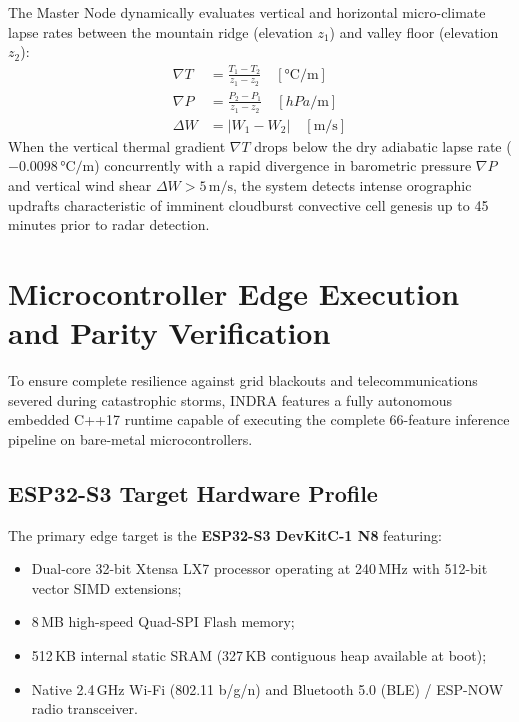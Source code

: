 \documentclass[journal,a4paper]{IEEEtran}
\begin{document}
The Master Node dynamically evaluates vertical and horizontal micro-climate lapse rates between the mountain ridge (elevation $z_1$) and valley floor (elevation $z_2$):
\begin{align}
\nabla T &= \frac{T_1 - T_2}{z_1 - z_2} \quad \left[\si{\celsius\per\metre}\right] \\
\nabla P &= \frac{P_2 - P_1}{z_1 - z_2} \quad \left[\si{hPa\per\metre}\right] \\
\Delta W &= |W_1 - W_2| \quad \left[\si{\metre\per\second}\right]
\end{align}
When the vertical thermal gradient $\nabla T$ drops below the dry adiabatic lapse rate ($-0.0098\,\si{\celsius\per\metre}$) concurrently with a rapid divergence in barometric pressure $\nabla P$ and vertical wind shear $\Delta W > 5\,\si{\metre\per\second}$, the system detects intense orographic updrafts characteristic of imminent cloudburst convective cell genesis up to 45 minutes prior to radar detection.

\section{Microcontroller Edge Execution and Parity Verification}

To ensure complete resilience against grid blackouts and telecommunications severed during catastrophic storms, INDRA features a fully autonomous embedded C++17 runtime capable of executing the complete 66-feature inference pipeline on bare-metal microcontrollers.

\subsection{ESP32-S3 Target Hardware Profile}

The primary edge target is the \textbf{ESP32-S3 DevKitC-1 N8} featuring:
\begin{itemize}
  \item Dual-core 32-bit Xtensa LX7 processor operating at 240\,MHz with 512-bit vector SIMD extensions;
  \item 8\,MB high-speed Quad-SPI Flash memory;
  \item 512\,KB internal static SRAM (327\,KB contiguous heap available at boot);
  \item Native 2.4\,GHz Wi-Fi (802.11 b/g/n) and Bluetooth 5.0 (BLE) / ESP-NOW radio transceiver.
\end{itemize}
\end{document}
